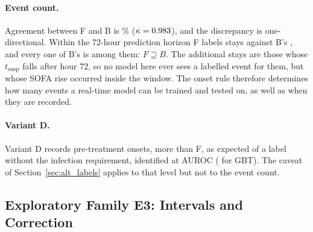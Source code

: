 \paragraph{Event count.}
Agreement between F and B is \pcPctAgreeBF\% ($\kappa = 0.983$), and the
discrepancy is one-directional. Within the
72-hour prediction horizon F labels \pcNPositiveF{} stays against B's
\pcNPositiveB, and every one of B's is among them: $F \supseteq B$. The
\pcFNExtraInHorizon{} additional stays are those whose $t_{\text{susp}}$ falls
after hour 72, so no model here ever sees a labelled event for them, but
whose SOFA rise occurred inside the window. The onset rule therefore determines
how many events a real-time model can be trained and tested on, as well as when
they are recorded.

\paragraph{Variant D.}
Variant D records \pcPreTreatOnsetsVarD{} pre-treatment onsets, more than F, as
expected of a label without the infection requirement, identified at
\pcPreTreatAurocPrimaryD{} AUROC (\pcPreTreatAurocGbtD{} for GBT). The caveat of
Section~\ref{sec:alt_labels} applies to that level but not to the event count.

\subsection{Exploratory Family E3: Intervals and Correction}

